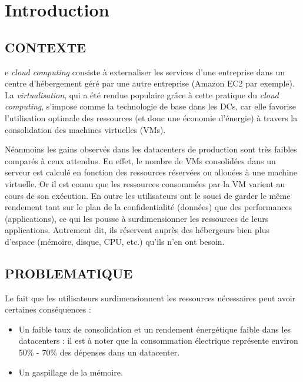%
%
\chapter*{Introduction}
\label{chap:intro}
\adjustmtc
\section*{CONTEXTE}

e \emph{cloud computing} consiste à externaliser les services d’une entreprise dans un centre d’hébergement géré par une autre entreprise (Amazon EC2 par exemple). La \emph{virtualisation}, qui a été rendue populaire grâce à cette pratique du \emph{cloud computing}, s'impose comme la technologie de base dans les \ac{DCs}, car elle favorise l'utilisation optimale des ressources (et donc une économie d'énergie) à travers la \break consolidation des machines virtuelles (\acs{VMs}).
\par\noindent Néanmoins les gains observés dans les datacenters de production sont très faibles comparés à ceux attendus. En effet, le nombre de VMs consolidées dans un serveur est calculé en fonction des ressources réservées ou allouées à une machine virtuelle. Or il est connu que les ressources consommées par la VM varient au cours de son exécution. En outre les utilisateurs ont le souci de garder le même rendement tant sur le plan de la \break confidentialité (données) que des performances (applications), ce qui les pousse à surdimensionner les ressources de leurs applications. Autrement dit, ils réservent auprès des hébergeurs bien plus d'espace (mémoire, disque, CPU, etc.) qu'ils n'en ont besoin.

\section*{PROBLEMATIQUE}

Le fait que les utilisateurs surdimensionnent les ressources nécessaires peut avoir certaines conséquences :

\begin{itemize}[label=, font=\large \color{darkorange}]
    \item Un faible taux de consolidation et un rendement énergétique faible dans les datacenters :  il est à noter que la consommation électrique représente environ 50\% - 70\% des dépenses dans un datacenter\cite{energy_consumption}.
    \item Un gaspillage de la mémoire.
\end{itemize}

